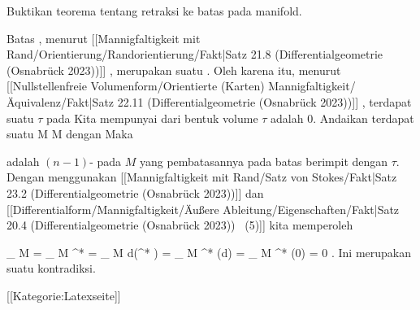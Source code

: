 {

Buktikan teorema tentang retraksi ke batas pada manifold.

}
{

Batas
, menurut
[[Mannigfaltigkeit mit Rand/Orientierung/Randorientierung/Fakt|Satz 21.8 (Differentialgeometrie (Osnabrück 2023))]]
, merupakan suatu
 {} {.}
Oleh karena itu, menurut
[[Nullstellenfreie Volumenform/Orientierte (Karten) Mannigfaltigkeit/Äquivalenz/Fakt|Satz 22.11 (Differentialgeometrie (Osnabrück 2023))]]
, terdapat suatu
$\tau$ pada
 Kita mempunyai
dari bentuk volume $\tau$ adalah $0$. Andaikan terdapat suatu
\maabbdisp {\varphi} { M } { \partial M
} {}
dengan
 Maka

\mathl{\varphi^* \tau}{} adalah
$(n-1)$-
pada $M$ yang pembatasannya pada batas berimpit dengan $\tau$. Dengan menggunakan
[[Mannigfaltigkeit mit Rand/Satz von Stokes/Fakt|Satz 23.2 (Differentialgeometrie (Osnabrück 2023))]]
dan
[[Differentialform/Mannigfaltigkeit/Äußere Ableitung/Eigenschaften/Fakt|Satz 20.4 (Differentialgeometrie (Osnabrück 2023))  (5)]]
kita memperoleh

\mavergleichskettealign
{\vergleichskettealign
{
\int_{  \partial M  }  \tau
}
{ =} {
\int_{  \partial  M  }  \varphi^* \tau
}
{ =} {
\int_{   M  }  d(\varphi^* \tau)
}
{ =} {
\int_{   M  }  \varphi^* (d\tau)
}
{ =} {
\int_{   M  }  \varphi^* (0)
}
}
{
\vergleichskettefortsetzungalign
{ =} { 0
}
{ } {}
{ } {}
{ } {}
}
{}{.}
Ini merupakan suatu kontradiksi.

 }

 [[Kategorie:Latexseite]]
